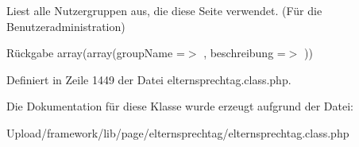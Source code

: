 Liest alle Nutzergruppen aus, die diese Seite verwendet. (Für die Benutzeradministration) \begin{DoxyReturn}{Rückgabe}
array(array(\textquotesingle{}group\+Name\textquotesingle{} =$>$ \textquotesingle{}\textquotesingle{}, \textquotesingle{}beschreibung\textquotesingle{} =$>$ \textquotesingle{}\textquotesingle{})) 
\end{DoxyReturn}


Definiert in Zeile 1449 der Datei elternsprechtag.\+class.\+php.



Die Dokumentation für diese Klasse wurde erzeugt aufgrund der Datei\+:\begin{DoxyCompactItemize}
\item 
Upload/framework/lib/page/elternsprechtag/elternsprechtag.\+class.\+php\end{DoxyCompactItemize}

